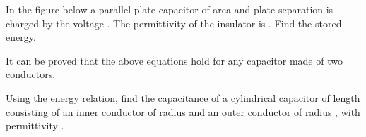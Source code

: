 
\begin{ELexample}{}

In the figure below a parallel-plate capacitor of area  and plate separation  is charged by the voltage . The permittivity of the insulator is \ELim{\epsilon}. Find the stored energy.


\begin{ELsolution}


\begin{ELimportant}{}


\end{ELimportant}

\begin{ELremark}{}

It can be proved that the above equations hold for any capacitor made of two conductors.

\end{ELremark}

\end{ELsolution}

\end{ELexample}


\begin{ELexample}{}

Using the energy relation, find the capacitance of a cylindrical capacitor of length  consisting of an inner conductor of radius  and an outer conductor of radius , with permittivity \ELim{\epsilon}.

\begin{ELsolution}


\end{ELsolution}

\end{ELexample}

\begin{ELunit}


\end{ELunit}
